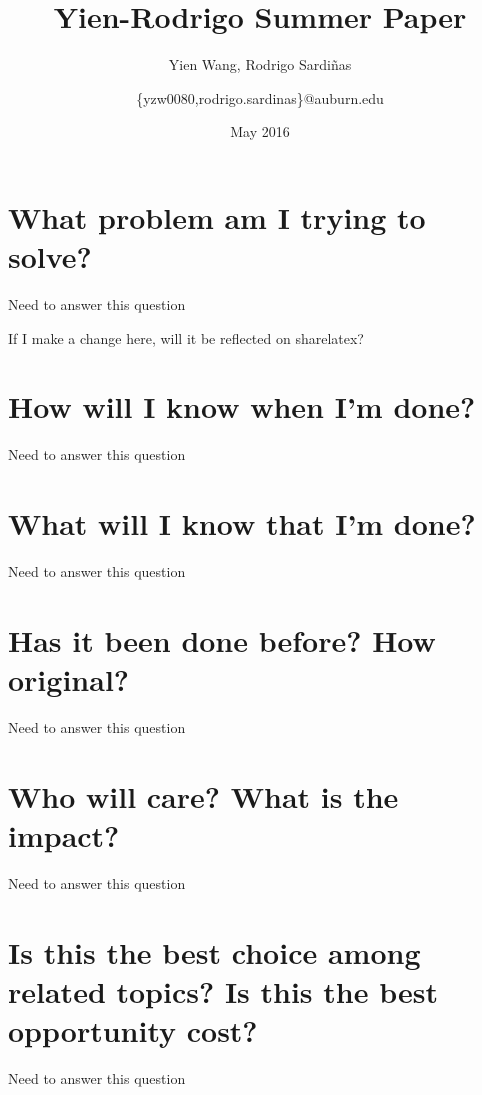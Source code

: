\documentclass{article}
\title{Yien-Rodrigo Summer Paper}
\author{Yien Wang, Rodrigo Sardi\~nas
        \and{ \{yzw0080,rodrigo.sardinas\}@auburn.edu} }
\date{May 2016}
\begin{document}
\maketitle
\tableofcontents

\section{What problem am I trying to solve?}
\label{sec:q1}
Need to answer this question

If I make a change here, will it be reflected on sharelatex?

\section{How will I know when I'm done?}
\label{sec:q2}
Need to answer this question

\section{What will I know that I'm done?}
\label{sec:q3}
Need to answer this question

\section{Has it been done before? How original?}
\label{sec:q4}
Need to answer this question

\section{Who will care? What is the impact?}
\label{sec:q5}    
Need to answer this question

\section{Is this the best choice among related topics? Is this the best opportunity cost?}
\label{sec:q6}
Need to answer this question
\end{document}
